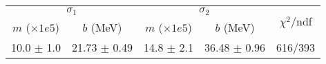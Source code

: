 \begin{tabular}{cc|cc||c}
\multicolumn{2}{c|}{$\sigma_1$} & \multicolumn{2}{|c}{$\sigma_2$}  & \multirow{2}{*}{$\chi^2/$ndf}\\
$m$ ($\times1e5$) & $b$ (MeV) & $m$ ($\times1e5$) & $b$ (MeV)  & \\
\hline
10.0 $\pm$ 1.0 & 21.73 $\pm$ 0.49 & 14.8 $\pm$ 2.1 & 36.48 $\pm$ 0.96 & 616/393\\
\end{tabular}

